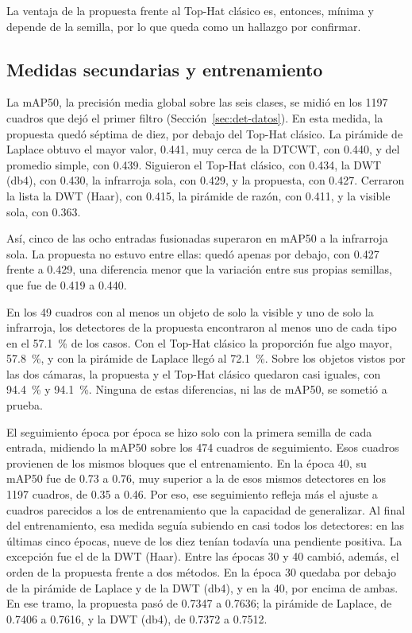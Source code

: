 La ventaja de la propuesta frente al Top-Hat clásico es, entonces, mínima y depende de la semilla, por
lo que queda como un hallazgo por confirmar.

\subsection{Medidas secundarias y entrenamiento}
\label{sec:res-secundarias}

La mAP50, la precisión media global sobre las seis clases, se midió en los 1197 cuadros que dejó el
primer filtro (Sección~\ref{sec:det-datos}). En esta medida, la propuesta quedó séptima de diez, por
debajo del Top-Hat clásico. La pirámide de Laplace obtuvo el mayor valor, 0.441, muy cerca de la DTCWT,
con 0.440, y del promedio simple, con 0.439. Siguieron el Top-Hat clásico, con 0.434, la DWT (db4), con
0.430, la infrarroja sola, con 0.429, y la propuesta, con 0.427. Cerraron la lista la DWT (Haar), con
0.415, la pirámide de razón, con 0.411, y la visible sola, con 0.363.

Así, cinco de las ocho entradas fusionadas superaron en mAP50 a la infrarroja sola. La propuesta no
estuvo entre ellas: quedó apenas por debajo, con 0.427 frente a 0.429, una diferencia menor que la
variación entre sus propias semillas, que fue de 0.419 a 0.440.

En los 49 cuadros con al menos un objeto de solo la visible y uno de solo la infrarroja, los detectores
de la propuesta encontraron al menos uno de cada tipo en el 57.1~\% de los casos. Con el Top-Hat
clásico la proporción fue algo mayor, 57.8~\%, y con la pirámide de Laplace llegó al 72.1~\%. Sobre los
objetos vistos por las dos cámaras, la propuesta y el Top-Hat clásico quedaron casi iguales, con 94.4~\% y 94.1~\%.
Ninguna de estas diferencias, ni las de mAP50, se sometió a prueba.

El seguimiento época por época se hizo solo con la primera semilla de cada entrada, midiendo la mAP50
sobre los 474 cuadros de seguimiento. Esos cuadros provienen de los mismos bloques que el
entrenamiento. En la época 40, su mAP50 fue de 0.73 a 0.76, muy superior a la de esos mismos detectores en los
1197 cuadros, de 0.35 a 0.46. Por eso, ese seguimiento refleja más el ajuste a cuadros parecidos a los de entrenamiento que la
capacidad de generalizar. Al final del entrenamiento, esa medida seguía subiendo en
casi todos los detectores: en las últimas cinco épocas, nueve de los diez tenían todavía una pendiente
positiva. La excepción fue el de la DWT (Haar). Entre las épocas 30 y 40 cambió, además, el orden de la propuesta
frente a dos métodos. En la época 30 quedaba por debajo de la pirámide de Laplace y de la DWT (db4), y
en la 40, por encima de ambas. En ese tramo, la propuesta pasó de 0.7347 a 0.7636; la pirámide de
Laplace, de 0.7406 a 0.7616, y la DWT (db4), de 0.7372 a 0.7512.

